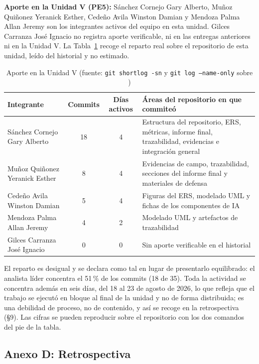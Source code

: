 \textbf{Aporte en la Unidad V (PE5):} S\'anchez Cornejo Gary Alberto, Mu\~noz Qui\~nonez Yeranick Esther, Cede\~no Avila Winston Damian y Mendoza Palma Allan Jeremy son los integrantes activos del equipo en esta unidad. Gilces Carranza Jos\'e Ignacio no registra aporte verificable, ni en las entregas anteriores ni en la Unidad V. La Tabla~\ref{tab:aporte-pe5} recoge el reparto real sobre el repositorio de esta unidad, le\'ido del historial y no estimado.

\begin{table}[H]
\centering
\small
\begin{tabular}{|p{4.3cm}|c|c|p{5.7cm}|}
\hline
\textbf{Integrante} & \textbf{Commits} & \textbf{D\'ias activos} & \textbf{\'Areas del repositorio en que commite\'o} \\ \hline
S\'anchez Cornejo Gary Alberto & 18 & 4 & Estructura del repositorio, ERS, m\'etricas, informe final, trazabilidad, evidencias e integraci\'on general \\ \hline
Mu\~noz Qui\~nonez Yeranick Esther & 8 & 4 & Evidencias de campo, trazabilidad, secciones del informe final y materiales de defensa \\ \hline
Cede\~no Avila Winston Damian & 5 & 4 & Figuras del ERS, modelado UML y fichas de los componentes de IA \\ \hline
Mendoza Palma Allan Jeremy & 4 & 2 & Modelado UML y artefactos de trazabilidad \\ \hline
Gilces Carranza Jos\'e Ignacio & 0 & 0 & Sin aporte verificable en el historial \\ \hline
\end{tabular}
\caption{Aporte en la Unidad V (fuente: \texttt{git shortlog -sn} y \texttt{git log --name-only} sobre \repourl)}
\label{tab:aporte-pe5}
\end{table}

El reparto es desigual y se declara como tal en lugar de presentarlo equilibrado: el analista l\'ider concentra el 51\,\% de los commits (18 de 35). Toda la actividad se concentra adem\'as en seis d\'ias, del 18 al 23 de agosto de 2026, lo que refleja que el trabajo se ejecut\'o en bloque al final de la unidad y no de forma distribuida; es una debilidad de proceso, no de contenido, y as\'i se recoge en la retrospectiva (\S9). Las cifras se pueden reproducir sobre el repositorio con los dos comandos del pie de la tabla.

\subsection*{Anexo D: Retrospectiva}

